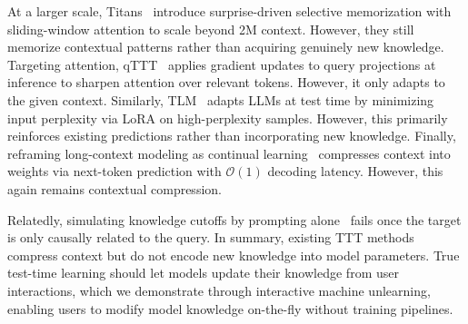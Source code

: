 At a larger scale, Titans~\cite{behrouz2024titans} introduce surprise-driven selective memorization with sliding-window attention to scale beyond 2M context. However, they still memorize contextual patterns rather than acquiring genuinely new knowledge. Targeting attention, qTTT~\cite{bansal2025let} applies gradient updates to query projections at inference to sharpen attention over relevant tokens. However, it only adapts to the given context. Similarly, TLM~\cite{hu2025test} adapts LLMs at test time by minimizing input perplexity via LoRA on high-perplexity samples. However, this primarily reinforces existing predictions rather than incorporating new knowledge. Finally, reframing long-context modeling as continual learning~\cite{tandon2025end} compresses context into weights via next-token prediction with $\mathcal{O}(1)$ decoding latency. However, this again remains contextual compression.

Relatedly, simulating knowledge cutoffs by prompting alone~\cite{gao2025can} fails once the target is only causally related to the query. In summary, existing TTT methods compress context but do not encode new knowledge into model parameters. True test-time learning should let models update their knowledge from user interactions, which we demonstrate through interactive machine unlearning, enabling users to modify model knowledge on-the-fly without training pipelines.
